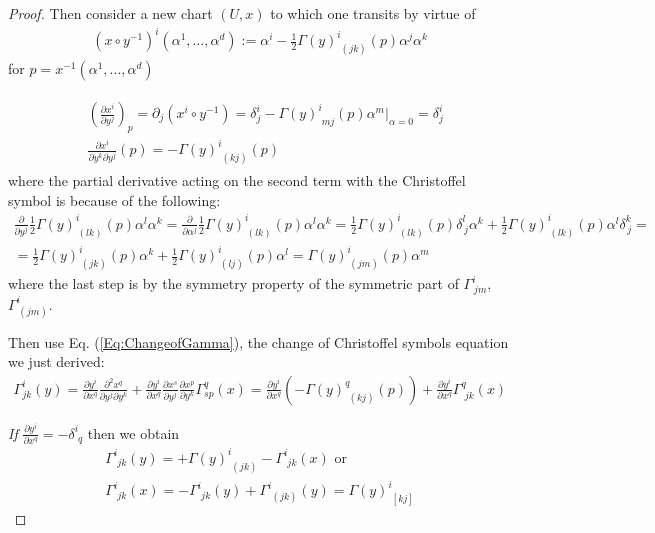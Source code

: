 \documentclass[10pt]{amsart}
\begin{document}
\begin{multicols*}{2}
\begin{proof}
	Then consider a new chart $(U, x)$ to which one transits by virtue of 
	\[
	\begin{gathered}
		(x\circ y^{-1})^{i}(\alpha^1, \dots, \alpha^d) := \alpha^i - \frac{1}{2} \Gamma(y)^i_{\,\, (jk)}(p) \alpha^j \alpha^k 
	\end{gathered}
	\]
	for $p = x^{-1}(\alpha^1, \dots , \alpha^d)$
	
	\[
	\begin{gathered}
		\begin{aligned} 
			& \left(\frac{\partial x^i}{ \partial y^j}\right)_p = \partial_j (x^i \circ y^{-1}) = \delta^i_j - \Gamma(y)^i_{\,\, mj}(p) \left. \alpha^m \right|_{\alpha = 0} = \delta^i_j \\
			& \frac{\partial x^i}{ \partial y^k \partial y^j}(p) = - \Gamma(y)^i_{ \, \, (kj)} (p)
		\end{aligned} 
	\end{gathered}
	\]
where the partial derivative acting on the second term with the Christoffel symbol is because of the following:
\[
\begin{gathered}
	\frac{\partial}{\partial y^j} \frac{1}{2} \Gamma(y)^i_{\, (lk)} (p) \alpha^l \alpha^k = \frac{\partial}{\partial \alpha^j} \frac{1}{2} \Gamma(y)^i_{\, (lk)} (p) \alpha^l \alpha^k = \frac{1}{2} \Gamma(y)^i_{\, (lk)} (p) \delta^l_{\, j} \alpha^k + \frac{1}{2} \Gamma(y)^i_{\, (lk)} (p) \alpha^l \delta^k_{\, j} = \\
	= \frac{1}{2} \Gamma(y)^i_{\, (jk)} (p)  \alpha^k + \frac{1}{2} \Gamma(y)^i_{\, (lj)} (p)  \alpha^l = \Gamma(y)^i_{\, (jm)}(p) \alpha^m
\end{gathered}
\]
where the last step is by the symmetry property of the symmetric part of $\Gamma^i_{\, jm}$, $\Gamma^i_{\, (jm)}$.

Then use Eq. (\ref{Eq:ChangeofGamma}), the change of Christoffel symbols equation we just derived:
\[
\begin{gathered}
\Gamma^i_{jk}(y) = \frac{ \partial y^i}{ \partial x^q} \frac{ \partial^2 x^q}{ \partial y^j \partial y^k} + \frac{ \partial y^i}{ \partial x^q } \frac{ \partial x^s }{ \partial y^j} \frac{ \partial x^p }{ \partial y^k} \Gamma^q_{sp}(x)	= \frac{ \partial y^i}{ \partial x^q} \left( - \Gamma(y)^q_{ \, \, (kj)} (p) \right) + \frac{ \partial y^i}{ \partial x^q } \Gamma^q_{ \, \, jk} (x)
\end{gathered}
\]

\emph{If} $\frac{\partial y^i}{\partial x^q} = -\delta^i_{\, \, q}$ then we obtain 
\[
\begin{gathered}
	\Gamma^i_{\, \, jk} (y) = + \Gamma(y)^i_{\,\, (jk)} - \Gamma^i_{\,\, jk} (x) \text{ or  } \\
	\Gamma^i_{\, \, jk} (x) = - \Gamma^i_{\, \, jk} (y) + \Gamma^i_{\, \, (jk)} (y) = \Gamma(y)^i_{\, \, [kj]}
\end{gathered}
\]



\end{proof}
\end{multicols*}
\end{document}
